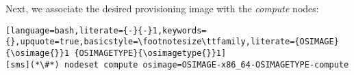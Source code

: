 Next, we associate the desired provisioning image with the {\em compute} nodes:

\begin{lstlisting}[language=bash,literate={-}{-}1,keywords={},upquote=true,basicstyle=\footnotesize\ttfamily,literate={OSIMAGE}{\osimage{}}1 {OSIMAGETYPE}{\osimagetype{}}1]
[sms](*\#*) nodeset compute osimage=OSIMAGE-x86_64-OSIMAGETYPE-compute
\end{lstlisting}
